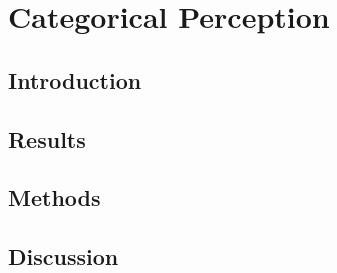 \chapter{Categorical Perception}
\section{Introduction}

\section{Results}


\section{Methods}


\section{Discussion}
